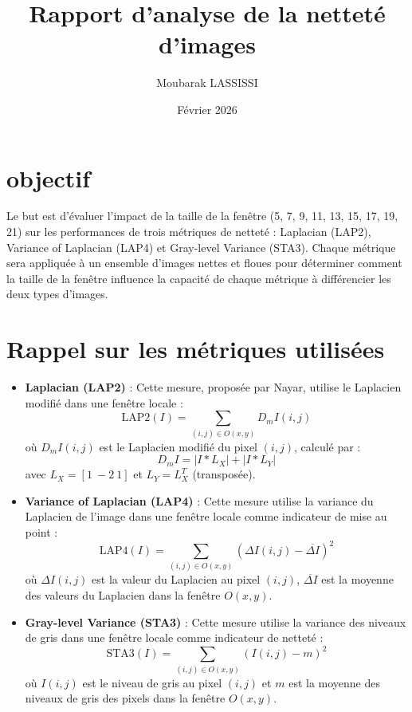 \documentclass[12pt,a4paper]{article}
\title{Rapport d'analyse de la netteté d'images}
\author{Moubarak LASSISSI}
\date{Février 2026}
\begin{document}
\maketitle

\section*{objectif}
Le  but est d'évaluer l'impact de la taille de la fenêtre (5, 7, 9, 11, 13, 15, 17, 19, 21) sur les performances de trois métriques de netteté : Laplacian (LAP2), Variance of Laplacian (LAP4) et Gray-level Variance (STA3). Chaque métrique sera appliquée à un ensemble d'images nettes et floues pour déterminer comment la taille de la fenêtre influence la capacité de chaque métrique à différencier les deux types d'images.  

\section*{Rappel sur les métriques utilisées}
\begin{itemize}
    \item \textbf{Laplacian (LAP2)} :
    Cette mesure, proposée par Nayar, utilise le Laplacien modifié dans une fenêtre locale :
    \begin{equation*}
        \text{LAP2}(I) = \sum_{(i,j) \in O(x,y)} D_m I(i,j)
    \end{equation*}
    où $D_m I(i,j)$ est le Laplacien modifié du pixel $(i,j)$, calculé par :
    \begin{equation*}
        D_m I = |I * L_X| + |I * L_Y|
    \end{equation*}
    avec $L_X = [1\ -2\ 1]$ et $L_Y = L_X^T$ (transposée).
    \item \textbf{Variance of Laplacian (LAP4)} :
    Cette mesure utilise la variance du Laplacien de l'image dans une fenêtre locale comme indicateur de mise au point :
    \begin{equation*}
        \text{LAP4}(I) = \sum_{(i,j) \in O(x,y)} \left( \Delta I(i,j) - \overline{\Delta I} \right)^2
    \end{equation*}
    où $\Delta I(i,j)$ est la valeur du Laplacien au pixel $(i,j)$, $\overline{\Delta I}$ est la moyenne des valeurs du Laplacien dans la fenêtre $O(x,y)$.
    \item \textbf{Gray-level Variance (STA3)} :
    Cette mesure utilise la variance des niveaux de gris dans une fenêtre locale comme indicateur de netteté :
    \begin{equation*}
        \text{STA3}(I) = \sum_{(i,j) \in O(x,y)} \left( I(i,j) - m \right)^2
    \end{equation*}
    où $I(i,j)$ est le niveau de gris au pixel $(i,j)$ et $m$ est la moyenne des niveaux de gris des pixels dans la fenêtre $O(x,y)$.
\end{itemize}
\end{document}
